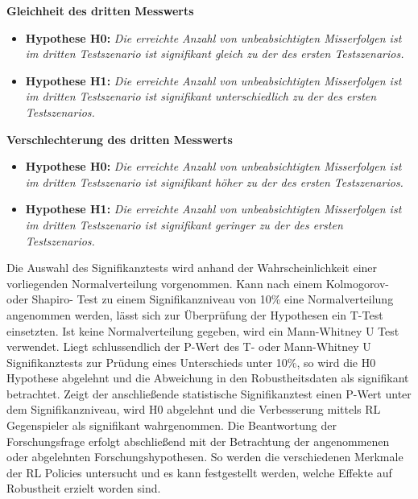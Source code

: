 \textbf{Gleichheit des dritten Messwerts}
\begin{itemize}
    \item \textbf{Hypothese H0:} \textit{Die erreichte Anzahl von unbeabsichtigten Misserfolgen ist im dritten Testszenario ist signifikant gleich zu der des ersten Testszenarios.}
    \item \textbf{Hypothese H1:} \textit{Die erreichte Anzahl von unbeabsichtigten Misserfolgen ist im dritten Testszenario ist signifikant unterschiedlich zu der des ersten Testszenarios.}
\end{itemize}

\textbf{Verschlechterung des dritten Messwerts}
\begin{itemize}
    \item \textbf{Hypothese H0:} \textit{Die erreichte Anzahl von unbeabsichtigten Misserfolgen ist im dritten Testszenario ist signifikant höher zu der des ersten Testszenarios.}
    \item \textbf{Hypothese H1:} \textit{Die erreichte Anzahl von unbeabsichtigten Misserfolgen ist im dritten Testszenario ist signifikant geringer zu der des ersten Testszenarios.}
\end{itemize}

Die Auswahl des Signifikanztests wird anhand der Wahrscheinlichkeit einer vorliegenden Normalverteilung vorgenommen.
Kann nach einem Kolmogorov- oder Shapiro- Test zu einem Signifikanzniveau von 10\% eine Normalverteilung angenommen werden, lässt sich zur Überprüfung der Hypothesen ein T-Test einsetzten.
Ist keine Normalverteilung gegeben, wird ein Mann-Whitney U Test verwendet.
Liegt schlussendlich der P-Wert des T- oder Mann-Whitney U Signifikanztests zur Prüdung eines Unterschieds unter 10\%, so wird die H0 Hypothese abgelehnt und die Abweichung in den Robustheitsdaten als signifikant betrachtet.
Zeigt der anschließende statistische Signifikanztest einen P-Wert unter dem Signifikanzniveau, wird H0 abgelehnt und die Verbesserung mittels RL Gegenspieler als signifikant wahrgenommen.
Die Beantwortung der Forschungsfrage erfolgt abschließend mit der Betrachtung der angenommenen oder abgelehnten Forschungshypothesen.
So werden die verschiedenen Merkmale der RL Policies untersucht und es kann festgestellt werden, welche Effekte auf Robustheit erzielt worden sind.
